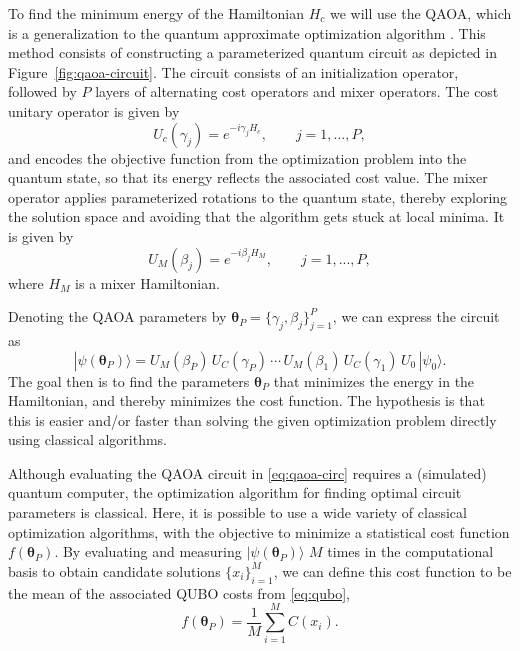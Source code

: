 \documentclass{article}
\newcommand{\boldtheta}{\boldsymbol{\theta}}
\begin{document}
To find the minimum energy of the Hamiltonian $H_c$ we will use the QAOA, which is a generalization to the quantum approximate optimization algorithm \cite{hadfield2019_qaoa2qaoa}. 
This method consists of constructing a parameterized quantum circuit as depicted in Figure~\ref{fig:qaoa-circuit}. The circuit consists of an initialization operator, followed by $P$ layers of alternating cost operators and mixer operators.
The cost unitary operator is given by 
\begin{equation}
    U_c(\gamma_j) = e^{-i \gamma_j H_c}, \qquad j=1,..., P,
    \label{eq:cost_operator}
\end{equation}
and encodes the objective function from the optimization problem into the quantum state, so that its energy reflects the associated cost value.
The mixer operator applies parameterized rotations to the quantum state, thereby exploring the solution space and avoiding that the algorithm gets stuck at local minima. It is given by
\begin{equation}
    U_M(\beta_j) = e^{-i \beta_j H_M}, \qquad j=1,..., P,
    \label{eq:mixer_operator}
\end{equation}
where $H_M$ is a mixer Hamiltonian.

Denoting the QAOA parameters by $\boldtheta_P = \{\gamma_j, \beta_j\}_{j=1}^{P}$, we can express the circuit as
\begin{equation}
    |\psi(\boldtheta_P)\rangle =
U_M(\beta_P)\, U_C(\gamma_P)\, \cdots \, U_M(\beta_1)\, U_C(\gamma_1)\, U_0\, |\psi_0\rangle.
    \label{eq:qaoa-circ}
\end{equation}
The goal then is to find the parameters $\boldtheta_P$ that minimizes the energy in the Hamiltonian, and thereby minimizes the cost function. The hypothesis is that this is easier and/or faster than solving the given optimization problem directly using classical algorithms.

Although evaluating the QAOA circuit in \eqref{eq:qaoa-circ} requires a (simulated) quantum computer, the optimization algorithm for finding optimal circuit parameters is classical. Here, it is possible to use a wide variety of classical optimization algorithms, with the objective to minimize a statistical cost function $f(\boldtheta_P)$. By evaluating and measuring $|\psi(\boldtheta_P)\rangle$ $M$ times in the computational basis to obtain candidate solutions $\{x_i\}_{i=1}^M$, we can define this cost function to be the mean of the associated QUBO costs from \eqref{eq:qubo},
\begin{equation}
    f(\boldtheta_P) = \frac{1}{M}\sum_{i=1}^{M} C(x_i).
    \label{eq:circuit_mean}
\end{equation}
\end{document}
